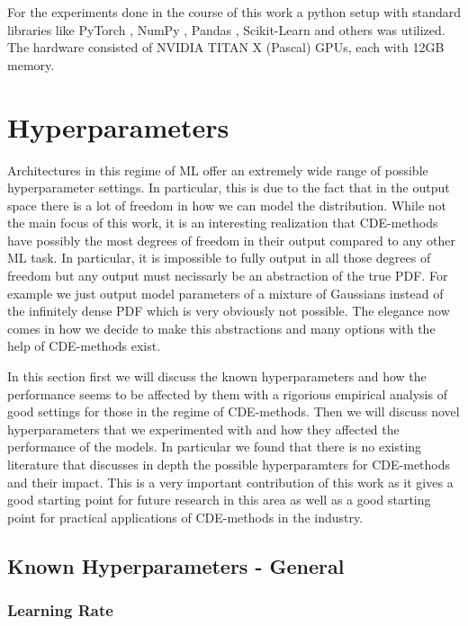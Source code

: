 For the experiments done in the course of this work a python setup with standard libraries like PyTorch \cite{paszke2019pytorch}, NumPy \cite{harris2020array}, Pandas \cite{reback2020pandas}, Scikit-Learn \cite{scikit-learn} and others was utilized. The hardware consisted of NVIDIA TITAN X (Pascal) GPUs, each with 12GB memory.

\section{Hyperparameters}\label{sec:hyperparameters}

Architectures in this regime of ML offer an extremely wide range of possible hyperparameter settings. In particular, this is due to the fact that in the output space there is a lot of freedom in how we can model the distribution. While not the main focus of this work, it is an interesting realization that CDE-methods have possibly the most degrees of freedom in their output compared to any other ML task. In particular, it is impossible to fully output in all those degrees of freedom but any output must necissarly be an abstraction of the true PDF. For example we just output model parameters of a mixture of Gaussians instead of the infinitely dense PDF which is very obviously not possible. The elegance now comes in how we decide to make this abstractions and many options with the help of CDE-methods exist.

In this section first we will discuss the known hyperparameters and how the performance seems to be affected by them with a rigorious empirical analysis of good settings for those in the regime of CDE-methods. Then we will discuss novel hyperparameters that we experimented with and how they affected the performance of the models. In particular we found that there is no existing literature that discusses in depth the possible hyperparamters for CDE-methods and their impact. This is a very important contribution of this work as it gives a good starting point for future research in this area as well as a good starting point for practical applications of CDE-methods in the industry.

\subsection{Known Hyperparameters - General}

\subsubsection{Learning Rate}

